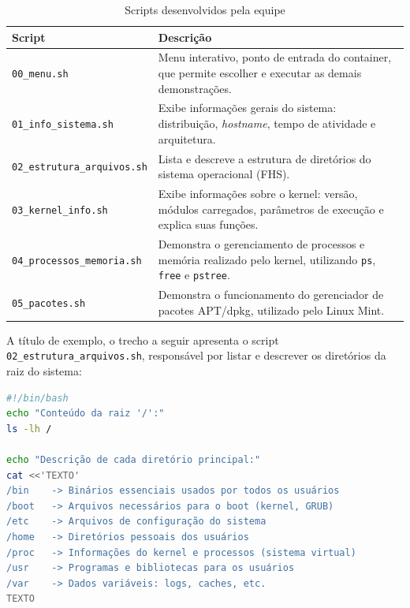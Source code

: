 \documentclass[a4paper,12pt]{article}
\begin{document}
\begin{table}[h]
    \centering
    \begin{tabular}{|l|p{9.5cm}|}
        \hline
        \textbf{Script} & \textbf{Descrição} \\ \hline
        \texttt{00\_menu.sh} &
            Menu interativo, ponto de entrada do container, que permite
            escolher e executar as demais demonstrações. \\ \hline
        \texttt{01\_info\_sistema.sh} &
            Exibe informações gerais do sistema: distribuição,
            \textit{hostname}, tempo de atividade e arquitetura. \\ \hline
        \texttt{02\_estrutura\_arquivos.sh} &
            Lista e descreve a estrutura de diretórios do sistema
            operacional (FHS). \\ \hline
        \texttt{03\_kernel\_info.sh} &
            Exibe informações sobre o kernel: versão, módulos carregados,
            parâmetros de execução e explica suas funções. \\ \hline
        \texttt{04\_processos\_memoria.sh} &
            Demonstra o gerenciamento de processos e memória realizado
            pelo kernel, utilizando \texttt{ps}, \texttt{free} e
            \texttt{pstree}. \\ \hline
        \texttt{05\_pacotes.sh} &
            Demonstra o funcionamento do gerenciador de pacotes
            APT/dpkg, utilizado pelo Linux Mint. \\ \hline
    \end{tabular}
    \caption{Scripts desenvolvidos pela equipe}
    \label{tab:scripts}
\end{table}

A título de exemplo, o trecho a seguir apresenta o script
\texttt{02\-\_es\-tru\-tu\-ra\-\_ar\-qui\-vos.sh}, responsável por listar e descrever os
diretórios da raiz do sistema:

\begin{lstlisting}[language=bash, caption={Trecho do script 02\_estrutura\_arquivos.sh}]
#!/bin/bash
echo "Conteúdo da raiz '/':"
ls -lh /

echo "Descrição de cada diretório principal:"
cat <<'TEXTO'
/bin    -> Binários essenciais usados por todos os usuários
/boot   -> Arquivos necessários para o boot (kernel, GRUB)
/etc    -> Arquivos de configuração do sistema
/home   -> Diretórios pessoais dos usuários
/proc   -> Informações do kernel e processos (sistema virtual)
/usr    -> Programas e bibliotecas para os usuários
/var    -> Dados variáveis: logs, caches, etc.
TEXTO
\end{lstlisting}
\end{document}
